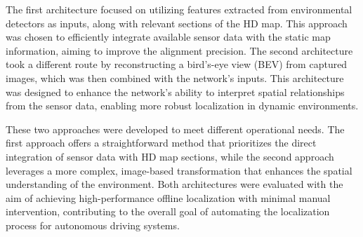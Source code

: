 The first architecture focused on utilizing features extracted from environmental detectors as inputs, along with relevant sections of the HD map. This approach was chosen to efficiently integrate available sensor data with the static map information, aiming to improve the alignment precision. The second architecture took a different route by reconstructing a bird's-eye view (BEV) from captured images, which was then combined with the network's inputs. This architecture was designed to enhance the network’s ability to interpret spatial relationships from the sensor data, enabling more robust localization in dynamic environments.

These two approaches were developed to meet different operational needs. The first approach offers a straightforward method that prioritizes the direct integration of sensor data with HD map sections, while the second approach leverages a more complex, image-based transformation that enhances the spatial understanding of the environment. Both architectures were evaluated with the aim of achieving high-performance offline localization with minimal manual intervention, contributing to the overall goal of automating the localization process for autonomous driving systems.
